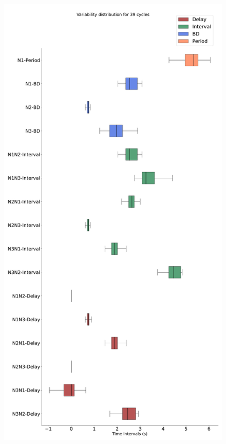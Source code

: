 \begin{figure}[htbp]
\begin{minipage}{0.9\textwidth}
\begin{minipage}[b]{0.45\textwidth}
			\includegraphics[width=\textwidth]{./invariants/data/SUSSEX/CV1a_driven1/images/stim_cv1a1_3phases_boxplot.pdf}
		\end{minipage}
		\begin{minipage}[b]{0.53\textwidth}

\end{minipage}
\end{minipage}
\end{figure}
